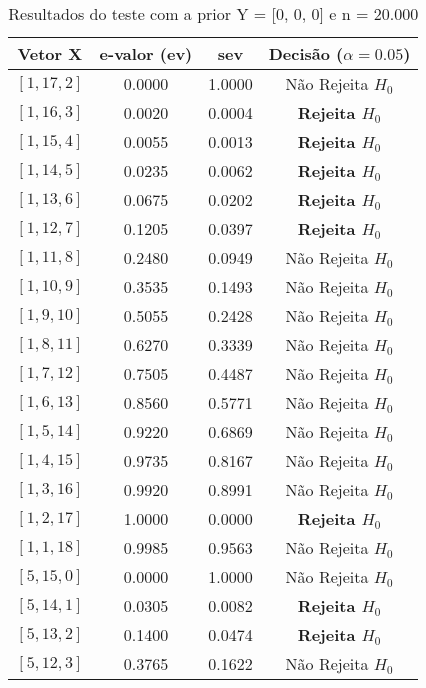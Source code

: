 \documentclass[12pt, a4paper]{article}
\begin{document}
\begin{table}[H]
    \centering
    \caption{Resultados do teste com a prior Y = [0, 0, 0] e n = 20.000}
    \label{tab:prior0-nova}
    \begin{tabular}{cccc}
        \toprule
        \textbf{Vetor X} & \textbf{e-valor (ev)} & \textbf{sev} & \textbf{Decisão ($\alpha=0.05$)} \\
        \midrule
        {$[1, 17, 2]$} & 0.0000 & 1.0000 & Não Rejeita $H_0$ \\
        {$[1, 16, 3]$} & 0.0020 & 0.0004 & \textbf{Rejeita $H_0$} \\
        {$[1, 15, 4]$} & 0.0055 & 0.0013 & \textbf{Rejeita $H_0$} \\
        {$[1, 14, 5]$} & 0.0235 & 0.0062 & \textbf{Rejeita $H_0$} \\
        {$[1, 13, 6]$} & 0.0675 & 0.0202 & \textbf{Rejeita $H_0$} \\
        {$[1, 12, 7]$} & 0.1205 & 0.0397 & \textbf{Rejeita $H_0$} \\
        {$[1, 11, 8]$} & 0.2480 & 0.0949 & Não Rejeita $H_0$ \\
        {$[1, 10, 9]$} & 0.3535 & 0.1493 & Não Rejeita $H_0$ \\
        {$[1, 9, 10]$} & 0.5055 & 0.2428 & Não Rejeita $H_0$ \\
        {$[1, 8, 11]$} & 0.6270 & 0.3339 & Não Rejeita $H_0$ \\
        {$[1, 7, 12]$} & 0.7505 & 0.4487 & Não Rejeita $H_0$ \\
        {$[1, 6, 13]$} & 0.8560 & 0.5771 & Não Rejeita $H_0$ \\
        {$[1, 5, 14]$} & 0.9220 & 0.6869 & Não Rejeita $H_0$ \\
        {$[1, 4, 15]$} & 0.9735 & 0.8167 & Não Rejeita $H_0$ \\
        {$[1, 3, 16]$} & 0.9920 & 0.8991 & Não Rejeita $H_0$ \\
        {$[1, 2, 17]$} & 1.0000 & 0.0000 & \textbf{Rejeita $H_0$} \\
        {$[1, 1, 18]$} & 0.9985 & 0.9563 & Não Rejeita $H_0$ \\
        \midrule
        {$[5, 15, 0]$} & 0.0000 & 1.0000 & Não Rejeita $H_0$ \\
        {$[5, 14, 1]$} & 0.0305 & 0.0082 & \textbf{Rejeita $H_0$} \\
        {$[5, 13, 2]$} & 0.1400 & 0.0474 & \textbf{Rejeita $H_0$} \\
        {$[5, 12, 3]$} & 0.3765 & 0.1622 & Não Rejeita $H_0$ \\

\end{tabular}
\end{table}
\end{document}
